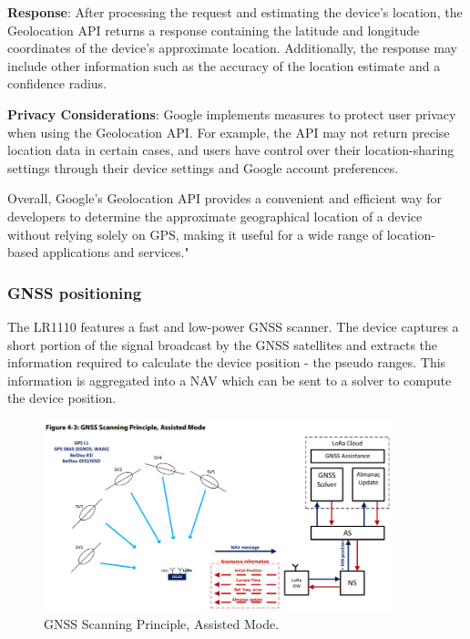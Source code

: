 \textbf{Response}: After processing the request and estimating the device's location, the Geolocation API returns a response containing the latitude and longitude coordinates of the device's approximate location. Additionally, the response may include other information such as the accuracy of the location estimate and a confidence radius.

\textbf{Privacy Considerations}: Google implements measures to protect user privacy when using the Geolocation API. For example, the \ac{API} may not return precise location data in certain cases, and users have control over their location-sharing settings through their device settings and Google account preferences.

Overall, Google's Geolocation API provides a convenient and efficient way for developers to determine the approximate geographical location of a device without relying solely on \ac{GPS}, making it useful for a wide range of location-based applications and services."


\subsubsection{GNSS positioning}

The LR1110 features a fast and low-power \ac{GNSS} scanner. The device captures a short portion of the signal broadcast by the
\ac{GNSS} satellites and extracts the information required to calculate the device position - the pseudo ranges. This information is aggregated into a \ac{NAV} which can be sent to a solver to compute the device position.

\begin{figure}[H]
    \centering
    \includegraphics[width=0.9\textwidth]{figures/GNSS_scanning.png}
    \caption{GNSS Scanning Principle, Assisted Mode.}
    \label{fig:gnss_scanning}
\end{figure}


